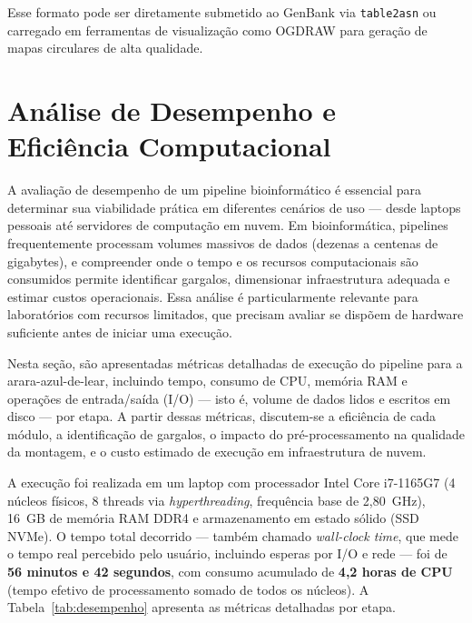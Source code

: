 Esse formato pode ser diretamente submetido ao GenBank via \texttt{table2asn} ou carregado em ferramentas de visualização como OGDRAW para geração de mapas circulares de alta qualidade.

\section{Análise de Desempenho e Eficiência Computacional}

A avaliação de desempenho de um pipeline bioinformático é essencial para determinar sua viabilidade prática em diferentes cenários de uso --- desde laptops pessoais até servidores de computação em nuvem. Em bioinformática, pipelines frequentemente processam volumes massivos de dados (dezenas a centenas de gigabytes), e compreender onde o tempo e os recursos computacionais são consumidos permite identificar gargalos, dimensionar infraestrutura adequada e estimar custos operacionais. Essa análise é particularmente relevante para laboratórios com recursos limitados, que precisam avaliar se dispõem de hardware suficiente antes de iniciar uma execução.

Nesta seção, são apresentadas métricas detalhadas de execução do pipeline para a arara-azul-de-lear, incluindo tempo, consumo de CPU, memória RAM e operações de entrada/saída (I/O) --- isto é, volume de dados lidos e escritos em disco --- por etapa. A partir dessas métricas, discutem-se a eficiência de cada módulo, a identificação de gargalos, o impacto do pré-processamento na qualidade da montagem, e o custo estimado de execução em infraestrutura de nuvem.

A execução foi realizada em um laptop com processador Intel Core i7-1165G7 (4 núcleos físicos, 8 threads via \textit{hyperthreading}, frequência base de 2,80~GHz), 16~GB de memória RAM DDR4 e armazenamento em estado sólido (SSD NVMe). O tempo total decorrido --- também chamado \textit{wall-clock time}, que mede o tempo real percebido pelo usuário, incluindo esperas por I/O e rede --- foi de \textbf{56 minutos e 42 segundos}, com consumo acumulado de \textbf{4,2 horas de CPU} (tempo efetivo de processamento somado de todos os núcleos). A Tabela~\ref{tab:desempenho} apresenta as métricas detalhadas por etapa.

